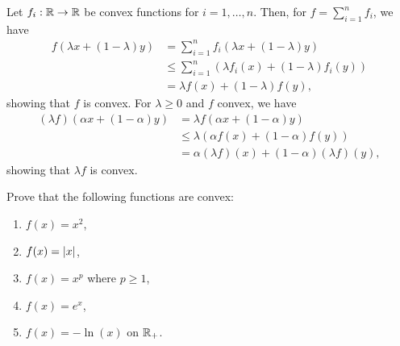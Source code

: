 \begin{solution}\label{sol:5.2}
  Let $f_i: \mathbb{R} \to \mathbb{R}$ be convex functions for $i = 1, \ldots, n$.
  Then, for $f = \sum_{i=1}^n f_i$, we have
  \begin{align*}
    f( \lambda x + (1 - \lambda) y )
    &= \sum_{i=1}^n f_i( \lambda x + (1 - \lambda) y ) \\
    &\leq \sum_{i=1}^n \left( \lambda f_i(x) + (1 - \lambda) f_i(y) \right) \\
    &= \lambda f(x) + (1 - \lambda) f(y),
  \end{align*}
  showing that $f$ is convex.
  For $\lambda \geq 0$ and $f$ convex, we have
  \begin{align*}
    (\lambda f)( \alpha x + (1 - \alpha) y )
    &= \lambda f( \alpha x + (1 - \alpha) y ) \\
    &\leq \lambda \left( \alpha f(x) + (1 - \alpha) f(y) \right) \\
    &= \alpha (\lambda f)(x) + (1 - \alpha) (\lambda f)(y),
  \end{align*}
  showing that $\lambda f$ is convex.
\end{solution}

\begin{exercise}\label{ex:5.3}
  Prove that the following functions are convex:
  \begin{enumerate}[label = (\emph{\roman*})]
    \item $f(x) = x^2$,
    \item $f(x) = \lvert x\rvert$,
    \item $f(x) = x^p$ where $p \geq 1$,
    \item $f(x) = e^x$,
    \item $f(x) = -\ln(x)$ on $\mathbb{R}_+$.
  \end{enumerate}
\end{exercise}

